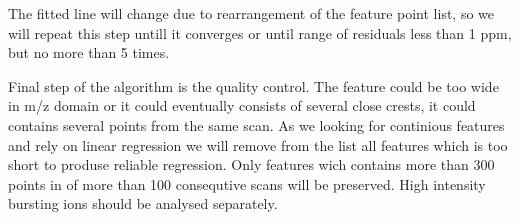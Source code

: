 \documentclass[]{article}
\newenvironment{Shaded}{\begin{snugshade}}{\end{snugshade}}
\newcommand{\KeywordTok}[1]{\textcolor[rgb]{0.13,0.29,0.53}{\textbf{#1}}}
\newcommand{\DataTypeTok}[1]{\textcolor[rgb]{0.13,0.29,0.53}{#1}}
\newcommand{\DecValTok}[1]{\textcolor[rgb]{0.00,0.00,0.81}{#1}}
\newcommand{\StringTok}[1]{\textcolor[rgb]{0.31,0.60,0.02}{#1}}
\newcommand{\OtherTok}[1]{\textcolor[rgb]{0.56,0.35,0.01}{#1}}
\newcommand{\OperatorTok}[1]{\textcolor[rgb]{0.81,0.36,0.00}{\textbf{#1}}}
\newcommand{\NormalTok}[1]{#1}
\begin{document}
The fitted line will change due to rearrangement of the feature point
list, so we will repeat this step untill it converges or until range of
residuals less than 1 ppm, but no more than 5 times.

Final step of the algorithm is the quality control. The feature could be
too wide in m/z domain or it could eventually consists of several close
crests, it could contains several points from the same scan. As we
looking for continious features and rely on linear regression we will
remove from the list all features which is too short to produse reliable
regression. Only features wich contains more than 300 points in of more
than 100 consequtive scans will be preserved. High intensity bursting
ions should be analysed separately.

\begin{Shaded}
\end{Shaded}
\end{document}
